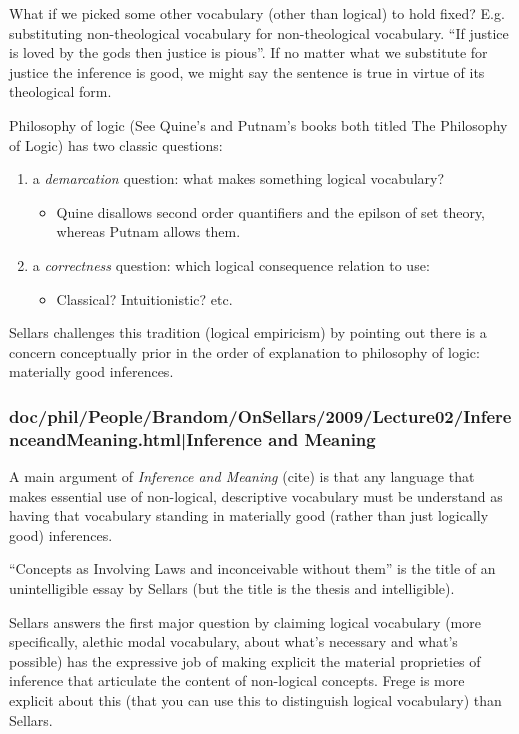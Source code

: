 \documentclass[12pt,a4paper]{report}
\begin{document}
What if we picked some other vocabulary (other than logical) to hold fixed? E.g.
substituting non-theological vocabulary for non-theological vocabulary.
``If justice is loved by the gods then justice is pious''. If no matter what we
substitute for justice the inference is good, we might say the sentence is true
in virtue of its theological form.

Philosophy of logic (See Quine's and Putnam's books both titled The Philosophy
of Logic) has two classic questions:
\begin{enumerate}
    \item a \emph{demarcation} question: what makes something logical vocabulary?
     \begin{itemize}
        \item Quine disallows second order quantifiers and the epilson of set
              theory, whereas Putnam allows them.
     \end{itemize}
    \item a \emph{correctness} question: which logical consequence relation to use:
      \begin{itemize}
      \item Classical? Intuitionistic? etc.
      \end{itemize}
\end{enumerate}

Sellars challenges this tradition (logical empiricism) by pointing out there is
a concern conceptually prior in the order of explanation to philosophy of
logic: materially good inferences.

\subsubsection{doc/phil/People/Brandom/OnSellars/2009/Lecture02/InferenceandMeaning.html|Inference and Meaning}

A main argument of \textit{Inference and Meaning} (cite) is that any language that makes essential use of non-logical, descriptive vocabulary must be understand as having that vocabulary standing in materially good (rather than just logically good) inferences.

``Concepts as Involving Laws and inconceivable without them'' is the title of an unintelligible essay by Sellars (but the title is the thesis and intelligible).

Sellars answers the first major question by claiming logical vocabulary (more specifically, alethic modal vocabulary, about what's necessary and what's possible) has the expressive job of making explicit the material proprieties of inference that articulate the content of non-logical concepts. Frege is more explicit about this (that you can use this to distinguish logical vocabulary) than Sellars.
\end{document}
